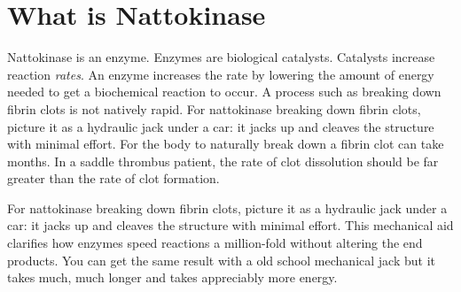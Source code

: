 \section{What is Nattokinase}
Nattokinase is an enzyme. Enzymes are biological catalysts. Catalysts increase reaction \textit{rates}. An enzyme increases the rate by lowering the amount of energy needed to get a biochemical reaction to occur. A process such as breaking down fibrin clots is not natively rapid. For nattokinase breaking down fibrin clots, picture it as a hydraulic jack under a car: it jacks up and cleaves the structure with minimal effort. For the body to naturally break down a fibrin clot can take months. In a saddle thrombus patient, the rate of clot dissolution should be far greater than the rate of clot formation.

For nattokinase breaking down fibrin clots, picture it as a hydraulic jack under a car: it jacks up and cleaves the structure with minimal effort. This mechanical aid clarifies how enzymes speed reactions a million-fold without altering the end products. You can get the same result with a old school mechanical jack but it takes much, much longer and takes appreciably more energy.

